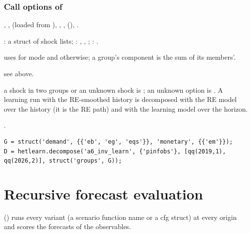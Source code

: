 \documentclass[11pt,a4paper]{article}
\DeclareRobustCommand{\codem}[1]{\texttt{\detokenize{#1}}}
\newenvironment{optspec}%
  {\begin{description}[style=sameline,leftmargin=2.7cm,labelwidth=2.5cm,font=\normalfont\itshape]}%
  {\end{description}}
\begin{document}
\subsubsection{Call options of \texorpdfstring{\codem{hetlearn.decompose}}{hetlearn.decompose}}\label{opt:decompose}
\begin{optspec}
  \item[Default] , ,  (loaded from
        ), , , 
        (), .
  \item[Values] : a struct of shock lists; : ,
        , ; : .
  \item[Math]  uses  for mode  and 
        otherwise; a group's component is the sum of its members'.
  \item[Assumptions] see above.
  \item[Interactions] a shock in two groups or an unknown shock is ;
        an unknown option is . A learning run with the RE-smoothed
        history is decomposed with the RE model over the history (it is the RE path) and with the
        learning model over the horizon.
  \item[Code] .
  \item[Example]
\begin{lstlisting}
G = struct('demand', {{'eb', 'eg', 'eqs'}}, 'monetary', {{'em'}});
D = hetlearn.decompose('a6_inv_learn', {'pinfobs'}, [qq(2019,1), qq(2026,2)], struct('groups', G));
\end{lstlisting}
\end{optspec}

\section{Recursive forecast evaluation}\label{sec:evaluate}

 () runs every variant
(a scenario function name or a cfg struct) at every origin and scores the forecasts of the
observables.
\end{document}
